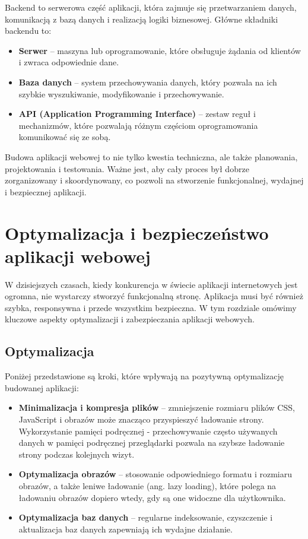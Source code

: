 Backend to serwerowa część aplikacji, która zajmuje się przetwarzaniem danych, komunikacją z bazą danych i realizacją logiki biznesowej. Główne składniki backendu to:

\begin{itemize}
\item \textbf{Serwer} -- maszyna lub oprogramowanie, które obsługuje żądania od klientów i zwraca odpowiednie dane.
\item \textbf{Baza danych} -- system przechowywania danych, który pozwala na ich szybkie wyszukiwanie, modyfikowanie i przechowywanie.
\item \textbf{API (Application Programming Interface)} -- zestaw reguł i mechanizmów, które pozwalają różnym częściom oprogramowania komunikować się ze sobą.
\end{itemize}


Budowa aplikacji webowej to nie tylko kwestia techniczna, ale także planowania, projektowania i testowania. Ważne jest, aby cały proces był dobrze zorganizowany i skoordynowany, co pozwoli na stworzenie funkcjonalnej, wydajnej i bezpiecznej aplikacji.

\section{Optymalizacja i bezpieczeństwo aplikacji webowej}

W dzisiejszych czasach, kiedy konkurencja w świecie aplikacji internetowych jest ogromna, nie wystarczy stworzyć funkcjonalną stronę. Aplikacja musi być również szybka, responsywna i przede wszystkim bezpieczna. W tym rozdziale omówimy kluczowe aspekty optymalizacji i zabezpieczania aplikacji webowych.

\subsection{Optymalizacja}
Poniżej przedstawione są kroki, które wpływają na pozytywną optymalizację budowanej aplikacji:
\begin{itemize}
\item \textbf{Minimalizacja i kompresja plików} -- zmniejszenie rozmiaru plików CSS, JavaScript i obrazów może znacząco przyspieszyć ładowanie strony.
Wykorzystanie pamięci podręcznej - przechowywanie często używanych danych w pamięci podręcznej przeglądarki pozwala na szybsze ładowanie strony podczas kolejnych wizyt.
\item \textbf{Optymalizacja obrazów} -- stosowanie odpowiedniego formatu i rozmiaru obrazów, a także leniwe ładowanie (ang. lazy loading), które polega na ładowaniu obrazów dopiero wtedy, gdy są one widoczne dla użytkownika.
\item \textbf{Optymalizacja baz danych} -- regularne indeksowanie, czyszczenie i aktualizacja baz danych zapewniają ich wydajne działanie\cite{optymalizacja}.
\end{itemize}

